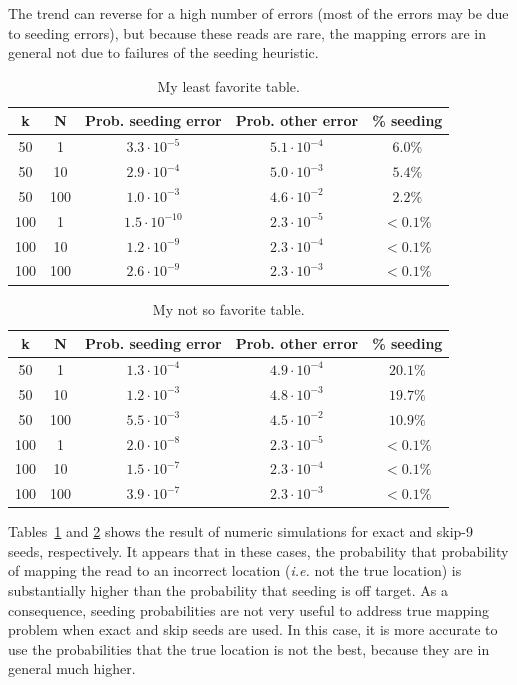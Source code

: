 \documentclass{article}
\begin{document}
The trend can reverse for a high number of errors (most of the errors may
be due to seeding errors), but because these reads are rare, the mapping
errors are in general not due to failures of the seeding heuristic.

\begin{table}
\renewcommand{\arraystretch}{1.1}
\centering
\begin{tabular}{ccccc}
k & N & Prob. seeding error & Prob. other error & \% seeding \\
\hline
50  &  1  & $3.3 \cdot 10^{-5}$  & $5.1 \cdot 10^{-4}$ & $6.0\%$ \\
50  & 10  & $2.9 \cdot 10^{-4}$  & $5.0 \cdot 10^{-3}$ & $5.4\%$ \\
50  & 100 & $1.0 \cdot 10^{-3}$  & $4.6 \cdot 10^{-2}$ & $2.2\%$ \\
100 &  1  & $1.5 \cdot 10^{-10}$ & $2.3 \cdot 10^{-5}$ & $< 0.1\%$ \\
100 & 10  & $1.2 \cdot 10^{-9}$  & $2.3 \cdot 10^{-4}$ & $< 0.1\%$ \\
100 & 100 & $2.6 \cdot 10^{-9}$  & $2.3 \cdot 10^{-3}$ & $< 0.1\%$
\end{tabular}
\caption{My least favorite table.}
\label{table_exact}
\end{table}

\begin{table}
\renewcommand{\arraystretch}{1.1}
\centering
\begin{tabular}{ccccc}
k & N & Prob. seeding error & Prob. other error & \% seeding \\
\hline
50  &  1  & $1.3 \cdot 10^{-4}$ & $4.9 \cdot 10^{-4}$ & $20.1\%$ \\
50  & 10  & $1.2 \cdot 10^{-3}$ & $4.8 \cdot 10^{-3}$ & $19.7\%$ \\
50  & 100 & $5.5 \cdot 10^{-3}$ & $4.5 \cdot 10^{-2}$ & $10.9\%$ \\
100 &  1  & $2.0 \cdot 10^{-8}$ & $2.3 \cdot 10^{-5}$ & $< 0.1\%$ \\
100 & 10  & $1.5 \cdot 10^{-7}$ & $2.3 \cdot 10^{-4}$ & $< 0.1\%$ \\
100 & 100 & $3.9 \cdot 10^{-7}$ & $2.3 \cdot 10^{-3}$ & $< 0.1\%$
\end{tabular}
\caption{My not so favorite table.}
\label{table_skip}
\end{table}

Tables~\ref{table_exact} and \ref{table_skip} shows the result of numeric
simulations for exact and skip-9 seeds, respectively. It appears that in
these cases, the probability that probability of mapping the read to an
incorrect location (\textit{i.e.} not the true location) is substantially
higher than the probability that seeding is off target. As a consequence,
seeding probabilities are not very useful to address true mapping problem
when exact and skip seeds are used. In this case, it is more accurate to
use the probabilities that the true location is not the best, because
they are in general much higher.
\end{document}

